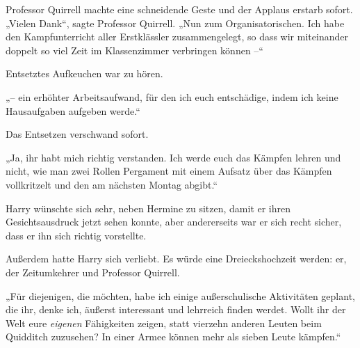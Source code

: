 Professor Quirrell machte eine schneidende Geste und der Applaus erstarb sofort. „Vielen Dank“, sagte Professor Quirrell. „Nun zum Organisatorischen. Ich habe den Kampfunterricht aller Erstklässler zusammengelegt, so dass wir miteinander doppelt so viel Zeit im Klassenzimmer verbringen können –“

Entsetztes Aufkeuchen war zu hören.

„– ein erhöhter Arbeitsaufwand, für den ich euch entschädige, indem ich keine Hausaufgaben aufgeben werde.“

Das Entsetzen verschwand sofort.

„Ja, ihr habt mich richtig verstanden. Ich werde euch das Kämpfen lehren und nicht, wie man zwei Rollen Pergament mit einem Aufsatz über das Kämpfen vollkritzelt und den am nächsten Montag abgibt.“

Harry wünschte sich sehr, neben Hermine zu sitzen, damit er ihren Gesichtsausdruck jetzt sehen konnte, aber andererseits war er sich recht sicher, dass er ihn sich richtig vorstellte.

Außerdem hatte Harry sich verliebt. Es würde eine Dreieckshochzeit werden: er, der Zeitumkehrer und Professor Quirrell.

„Für diejenigen, die möchten, habe ich einige außerschulische Aktivitäten geplant, die ihr, denke ich, äußerst interessant und lehrreich finden werdet. Wollt ihr der Welt eure \emph{eigenen} Fähigkeiten zeigen, statt vierzehn anderen Leuten beim Quidditch zuzusehen? In einer Armee können mehr als sieben Leute kämpfen.“

